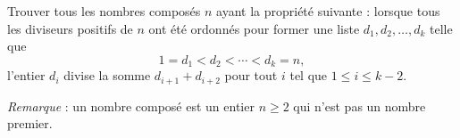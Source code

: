 Trouver tous les nombres composés $n$ ayant la propriété suivante : lorsque tous les diviseurs positifs de
$n$ ont été ordonnés pour former une liste $d_1, d_2, \ldots, d_k$ telle que
\[
1 = d_1 < d_2 < \cdots < d_k = n,
\]
l'entier $d_i$ divise la somme $d_{i+1} + d_{i+2}$ pour tout $i$ tel que $1 \leqslant i \leqslant k - 2$.

\emph{Remarque} : un nombre composé est un entier $n \geqslant 2$ qui n'est pas un nombre premier.
